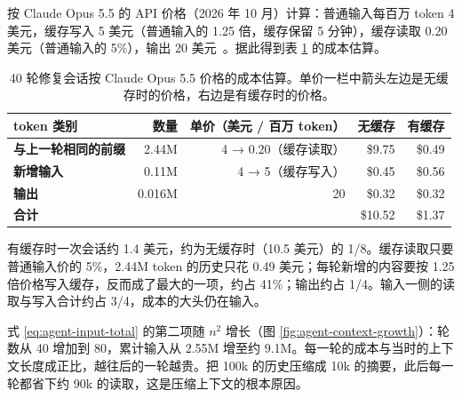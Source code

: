 按 Claude Opus 5.5 的 API 价格（2026 年 10 月）计算：普通输入每百万 token 4 美元，缓存写入 5 美元（普通输入的 1.25 倍，缓存保留 5 分钟），缓存读取 0.20 美元（普通输入的 5\%），输出 20 美元~\cite{anthropicpricing}。据此得到表 \ref{tab:agent-cost} 的成本估算。

\begin{table}[H]
\centering\small
\begin{tabularx}{\textwidth}{>{\bfseries}X r r r r}
\toprule
token 类别 & 数量 & 单价（美元 / 百万 token） & 无缓存 & 有缓存\\
\midrule
与上一轮相同的前缀 & 2.44M & 4 → 0.20（缓存读取） & \$9.75 & \$0.49\\
新增输入 & 0.11M & 4 → 5（缓存写入） & \$0.45 & \$0.56\\
输出 & 0.016M & 20 & \$0.32 & \$0.32\\
\midrule
合计 & & & \$10.52 & \$1.37\\
\bottomrule
\end{tabularx}
\caption{40 轮修复会话按 Claude Opus 5.5 价格的成本估算。单价一栏中箭头左边是无缓存时的价格，右边是有缓存时的价格。}
\label{tab:agent-cost}
\end{table}

有缓存时一次会话约 1.4 美元，约为无缓存时（10.5 美元）的 1/8。缓存读取只要普通输入价的 5\%，2.44M token 的历史只花 0.49 美元；每轮新增的内容要按 1.25 倍价格写入缓存，反而成了最大的一项，约占 41\%；输出约占 1/4。输入一侧的读取与写入合计约占 3/4，成本的大头仍在输入。

式 \eqref{eq:agent-input-total} 的第二项随 \(n^2\) 增长（图 \ref{fig:agent-context-growth}）：轮数从 40 增加到 80，累计输入从 2.55M 增至约 9.1M。每一轮的成本与当时的上下文长度成正比，越往后的一轮越贵。把 100k 的历史压缩成 10k 的摘要，此后每一轮都省下约 90k 的读取，这是压缩上下文的根本原因。

